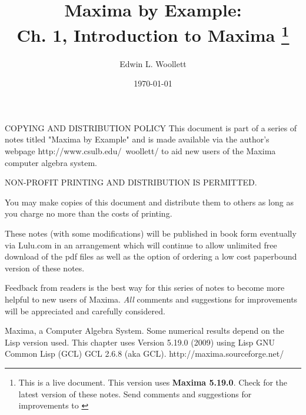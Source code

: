 \documentclass[11pt]{article}
\title{Maxima by Example:\\ Ch. 1, Introduction to Maxima
             \thanks{This is a live document. This version uses \textbf{Maxima 5.19.0}.
			 Check \; \textbf{ \tedhome } \; for the latest version of these notes. Send comments and
			 suggestions for improvements to \textbf{\tedmail} } }
\author{Edwin L. Woollett}
\date{\today}
\newcommand{\tcdb}{\textcolor{mdb}}
\newcommand{\tcbr}{\textcolor{BrickRed}}
\begin{document}
\small
\maketitle
\tableofcontents
{}
\newpage
\normalsize
\begin{myVerbatim2} 
COPYING AND DISTRIBUTION POLICY    
This document is part of a series of notes titled
"Maxima by Example" and is made available
via the author's webpage http://www.csulb.edu/~woollett/
to aid new users of the Maxima computer algebra system.	
	
NON-PROFIT PRINTING AND DISTRIBUTION IS PERMITTED.
	
You may make copies of this document and distribute them
to others as long as you charge no more than the costs of printing.	

These notes (with some modifications) will be published in book form
eventually via Lulu.com in an arrangement which will continue
to allow unlimited free download of the pdf files as well as the option
of ordering a low cost paperbound version of these notes.
\end{myVerbatim2}	
\smallskip
\noindent \tcbr{Feedback from readers is the best way for this series of notes
  to become more helpful to new users of Maxima}.
\tcdb{\emph{All} comments and suggestions for improvements will be appreciated and
  carefully considered}.
\smallskip
{} 
\smallskip
\begin{myVerbatim2s}
  Maxima, a Computer Algebra System.
  Some numerical results depend on the Lisp version used.
  This chapter uses Version 5.19.0 (2009) using Lisp GNU 
  Common Lisp (GCL) GCL 2.6.8 (aka GCL).
  http://maxima.sourceforge.net/
\end{myVerbatim2s} 
\newpage
\end{document}
